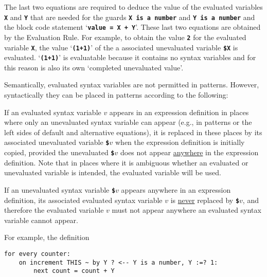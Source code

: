 \documentclass[12pt]{article}
\newcommand{\TT}[1]{{\tt \bfseries #1}}
\newcommand{\ikey}[2]{{\bf \em #1}\index{#2}}
\newenvironment{indpar}[1][0.3in]%
	{\begin{list}{}%
		     {\setlength{\itemsep}{0in}%
		      \setlength{\topsep}{0in}%
		      \setlength{\parsep}{1ex}%
		      \setlength{\labelwidth}{#1}%
		      \setlength{\leftmargin}{#1}%
		      \addtolength{\leftmargin}{\labelsep}}%
	 \item}%
	{\end{list}}
\begin{document}
The last two equations are required to deduce the value of the evaluated
variables \TT{X} and \TT{Y} that are needed for the guards
\TT{X is a number} and \TT{Y is a number} and the block code statement
`\TT{value = X + Y}'.  These last two equations are obtained by
the Evaluation Rule.  For example, to obtain the value \TT{2} for the
evaluated variable \TT{X}, the value `\TT{(1+1)}' of the a associated
unevaluated variable \TT{\$X} is evaluated.  `\TT{(1+1)}' is
evaluatable because it contains no syntax variables and for this reason is
also its own `completed unevaluated value'.

Semantically, evaluated syntax variables are not permitted in patterns.
However, syntactically they can be placed in patterns according to the
following:

\begin{indpar}
\begin{list}{}{}
\item [\ikey{Evaluated Variable Promotion Rule}%
{evaluated variable!promotion rule}:]%
\label{EVALUATED-VARIABLE-PROMOTION-RULE}
If an evaluated syntax variable $v$ appears in an expression definition
in places where only an unevaluated syntax variable can appear
(e.g., in patterns or the left sides of default and alternative
equations), it is
replaced in these places by its associated unevaluated variable
\TT{\$}$v$ when the expression definition is initially copied,
provided the unevaluated \TT{\$}$v$ does not appear \underline{anywhere}
in the expression definition.  Note that in places where it is ambiguous
whether an evaluated or unevaluated variable is intended, the evaluated
variable will be used.

If an unevaluated syntax variable \TT{\$}$v$ appears anywhere in
an expression definition, its associated evaluated syntax variable $v$
is \underline{never} replaced by \TT{\$}$v$, and therefore the evaluated
variable $v$ must not appear anywhere an evaluated syntax variable
cannot appear.
\end{list}
\end{indpar}

For example, the definition

\begin{indpar}\begin{verbatim}
for every counter:
    on increment THIS ~ by Y ? <-- Y is a number, Y :=? 1:
        next count = count + Y
\end{verbatim}\end{indpar}
\end{document}
